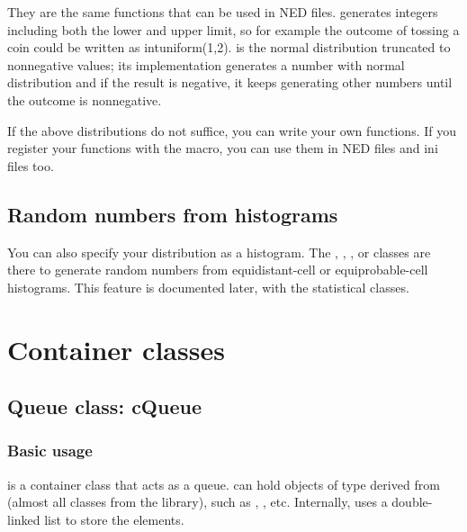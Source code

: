 \begin{longtable}{|p{6.5cm}|p{7.5cm}|}
\end{longtable}


They are the same functions that can be used in NED files.
 generates integers including both the lower and
upper limit, so for example the outcome of tossing a coin could be
written as intuniform(1,2).   is the normal
distribution truncated to nonnegative values; its implementation
generates a number with normal distribution and if the result is
negative, it keeps generating other numbers until the outcome is
nonnegative.

If the above distributions do not suffice, you can write your own
functions. If you register your functions
with the  macro, you can use them in NED
files and ini files too.


\subsection{Random numbers from histograms}

You can also specify your distribution as a
histogram. The
, ,
,  or  classes
are there to generate random numbers from equi\-dis\-tant-cell or
equiprobable-cell histograms.  This feature is documented later, with
the statistical classes.





\section{Container classes}

\subsection{Queue class: cQueue}

\subsubsection{Basic usage}


 is a container class that acts as a queue.
 can hold objects of type derived from 
(almost all classes from the {\opp} library), such as
, , etc. Internally, 
uses a double-linked list to store the elements.

